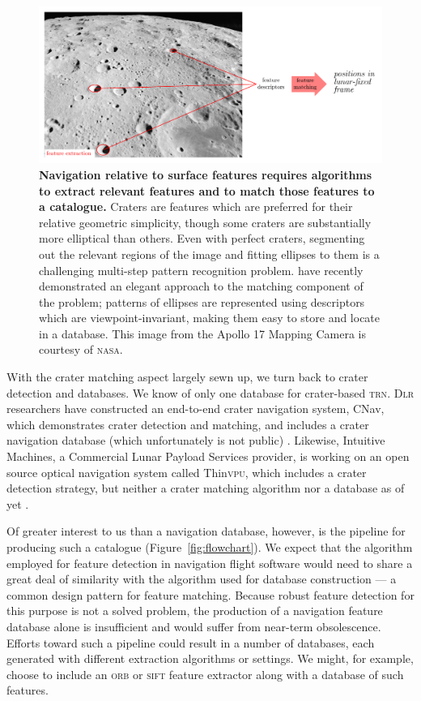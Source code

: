 \documentclass[12pt]{article}
\begin{document}
\begin{figure}
\includegraphics[width=\textwidth]{cdma.pdf}
\caption{\label{fig:cdma}\textbf{Navigation relative to surface features requires algorithms to extract relevant features and to match those features to a catalogue.} Craters are features which are preferred for their relative geometric simplicity, though some craters are substantially more elliptical than others. Even with perfect craters, segmenting out the relevant regions of the image and fitting ellipses to them is a challenging multi-step pattern recognition problem. \citet{Christian2020} have recently demonstrated an elegant approach to the matching component of the problem; patterns of ellipses are represented using descriptors which are viewpoint-invariant, making them easy to store and locate in a database. This image from the Apollo 17 Mapping Camera is courtesy of \textsc{nasa}. }
\end{figure}

With the crater matching aspect largely sewn up, we turn back to crater detection and databases. We know of only one database for crater-based \textsc{trn}. \textsc{Dlr} researchers have constructed an end-to-end crater navigation system, CNav, which demonstrates crater detection and matching, and includes a crater navigation database (which unfortunately is not public) \citep{Maass2016,Maass2020}. Likewise, Intuitive Machines, a Commercial Lunar Payload Services provider, is working on an open source optical navigation system called Thin\textsc{vpu}, which includes a crater detection strategy, but neither a crater matching algorithm nor a database as of yet \citep{Stewart2020}.

Of greater interest to us than a navigation database, however, is the pipeline for producing such a catalogue (Figure~\ref{fig:flowchart}). We expect that the algorithm employed for feature detection in navigation flight software would need to share a great deal of similarity with the algorithm used for database construction --- a common design pattern for feature matching. Because robust feature detection for this purpose is not a solved problem, the production of a navigation feature database alone is insufficient and would suffer from near-term obsolescence. Efforts toward such a pipeline could result in a number of databases, each generated with different extraction algorithms or settings. We might, for example, choose to include an \textsc{orb} or \textsc{sift} feature extractor along with a database of such features.
\end{document}
